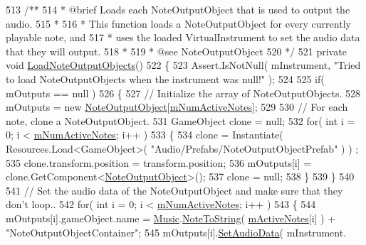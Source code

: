 \begin{DoxyCodeInclude}
513 \textcolor{comment}{    /**}
514 \textcolor{comment}{     * @brief Loads each NoteOutputObject that is used to output the audio.}
515 \textcolor{comment}{     * }
516 \textcolor{comment}{     * This function loads a NoteOutputObject for every currently playable note, and }
517 \textcolor{comment}{     * uses the loaded VirtualInstrument to set the audio data that they will output.}
518 \textcolor{comment}{     * }
519 \textcolor{comment}{     * @see NoteOutputObject}
520 \textcolor{comment}{    */}
521     \textcolor{keyword}{private} \textcolor{keywordtype}{void} \hyperlink{group___v_i_m_priv_func_ga8817e32cc5074737b4d9489922b0fcb8}{LoadNoteOutputObjects}()
522     \{
523         Assert.IsNotNull( mInstrument, \textcolor{stringliteral}{"Tried to load NoteOutputObjects when the instrument was null!"} );
524 
525         \textcolor{keywordflow}{if}( mOutputs == null )
526         \{
527             \textcolor{comment}{// Initialize the array of NoteOutputObjects.}
528             mOutputs = \textcolor{keyword}{new} \hyperlink{class_note_output_object}{NoteOutputObject}[\hyperlink{group___v_i_m_priv_ga0f7e11945763c48057be326b661dfdaf}{mNumActiveNotes}];
529 
530             \textcolor{comment}{// For each note, clone a NoteOutputObject.}
531             GameObject clone = null;
532             \textcolor{keywordflow}{for}( \textcolor{keywordtype}{int} i = 0; i < \hyperlink{group___v_i_m_priv_ga0f7e11945763c48057be326b661dfdaf}{mNumActiveNotes}; i++ )
533             \{
534                 clone = Instantiate( Resources.Load<GameObject>( \textcolor{stringliteral}{"Audio/Prefabs/NoteOutputObjectPrefab"} ) )
      ;
535                 clone.transform.position = transform.position;
536                 mOutputs[i] = clone.GetComponent<\hyperlink{class_note_output_object}{NoteOutputObject}>();
537                 clone = null;
538             \}
539         \}
540 
541         \textcolor{comment}{// Set the audio data of the NoteOutputObject and make sure that they don't loop..}
542         \textcolor{keywordflow}{for}( \textcolor{keywordtype}{int} i = 0; i < \hyperlink{group___v_i_m_priv_ga0f7e11945763c48057be326b661dfdaf}{mNumActiveNotes}; i++ )
543         \{
544             mOutputs[i].gameObject.name = \hyperlink{class_music}{Music}.\hyperlink{group___music_stat_func_ga85a22c905d56d4c5f4e62159bfecee8c}{NoteToString}( 
      \hyperlink{group___v_i_m_priv_ga5cedf9995d59b416412677e6004b659c}{mActiveNotes}[i] ) + \textcolor{stringliteral}{"NoteOutputObjectContainer"};
545             mOutputs[i].\hyperlink{group___n_o_o_pub_func_gaef9ab691f0a2671a62249d853f24162d}{SetAudioData}( mInstrument.

\end{DoxyCodeInclude}
